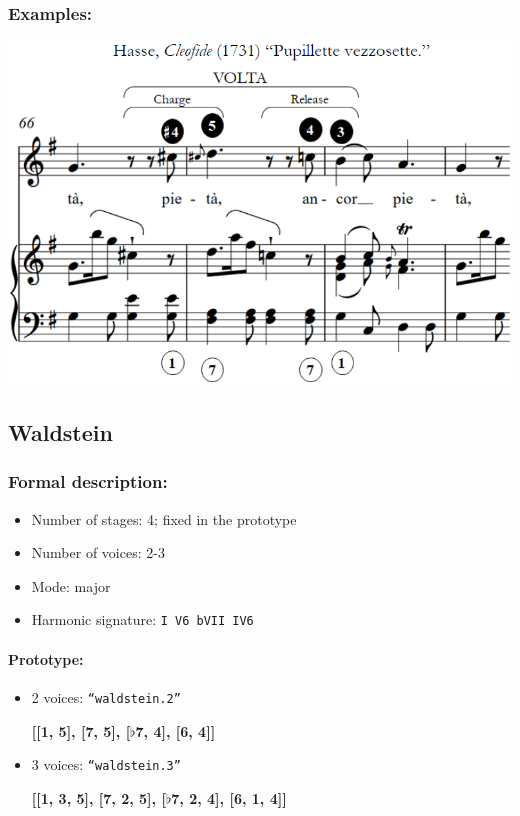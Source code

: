 \documentclass[11pt, openany]{article}
\begin{document}
\subsubsection{Examples:}
\begin{center}
\includegraphics[scale=0.5]{volta.png}
\end{center}


	\subsection{Waldstein}
	
\subsubsection{Formal description:}
\begin{itemize}
\item Number of stages: 4; fixed in the prototype
\item Number of voices: 2-3
\item Mode: major
\item Harmonic signature: \texttt{I V6 bVII IV6}
\end{itemize}

\paragraph{Prototype:}
\begin{itemize}
\item 2 voices: \texttt{“waldstein.2”}
	\begin{center}
	\textbf{[[1, 5], [7, 5], [$\flat$7, 4], [6, 4]]}
	\end{center}
\item 3 voices: \texttt{“waldstein.3”}
	\begin{center}
	\textbf{[[1, 3, 5], [7, 2, 5], [$\flat$7, 2, 4], [6, 1, 4]]}
	\end{center}
\end{itemize}
\end{document}
